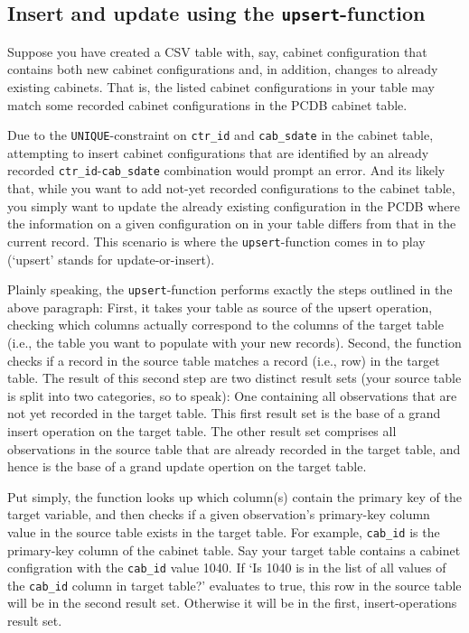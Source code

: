 \subsection{Insert and update using the \texttt{upsert}-function}\label{subsec_upsert_data_function}

Suppose you have created a CSV table with, say, cabinet configuration that contains both new cabinet configurations and, in addition, changes to already existing cabinets. That is, the listed cabinet configurations in your table may match some recorded cabinet configurations in the PCDB cabinet table. 

Due to the \texttt{UNIQUE}-constraint on \texttt{ctr\_id} and \texttt{cab\_sdate} in the cabinet table, attempting to insert cabinet configurations that are identified by an already recorded \texttt{ctr\_id}-\texttt{cab\_sdate} combination would prompt an error. 
And its likely that, while you want to add not-yet recorded configurations to the cabinet table, you simply want to update the already existing configuration in the PCDB where the information on a given configuration on in your table differs from that in the current record.
This scenario is where the \texttt{upsert}-function comes in to play (`upsert' stands for update-or-insert).

Plainly speaking, the \texttt{upsert}-function performs exactly the steps outlined in the above paragraph: 
First, it takes your table as source of the upsert operation, checking which columns actually correspond to the columns of the target table (i.e., the table you want to populate with your new records). 
Second, the function checks if a record in the source table matches a record (i.e., row) in the target table.
The result of this second step are two distinct result sets (your source table is split into two categories, so to speak): One containing all observations that are not yet recorded in the target table. This first result set is the base of a grand insert operation on the target table.
The other result set comprises all observations in the source table that are already recorded in the target table, and hence is the base of a grand update opertion on the target table. 

Put simply, the function looks up which column(s) contain the primary key of the target variable, and then checks if a given observation's primary-key column value in the source table exists in the target table. 
For example, \texttt{cab\_id} is the primary-key column of the cabinet table. Say your target table contains a cabinet configration with the \texttt{cab\_id} value 1040.
If `Is 1040 is in the list of all values of the \texttt{cab\_id} column in target table?' evaluates to true, this row in the source table will be in the second result set. 
Otherwise it will be in the first, insert-operations result set.


